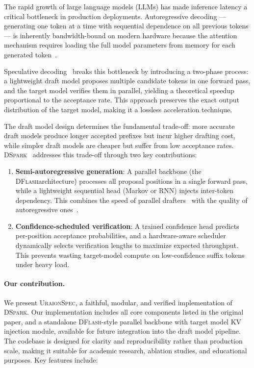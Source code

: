 \documentclass[11pt,a4paper]{article}
\newcommand{\UraionSpec}{\textsc{UraionSpec}}
\newcommand{\DSpark}{\textsc{DSpark}}
\newcommand{\DFlash}{\textsc{DFlash}}
\begin{document}
The rapid growth of large language models (LLMs) has made inference latency a
critical bottleneck in production deployments. Autoregressive decoding ---
generating one token at a time with sequential dependence on all previous
tokens --- is inherently bandwidth-bound on modern hardware because the
attention mechanism requires loading the full model parameters from memory
for each generated token~\cite{pope2023efficiently, leviathan2023fast}.

Speculative decoding~\cite{leviathan2023fast, chen2023accelerating} breaks
this bottleneck by introducing a two-phase process: a lightweight draft model
proposes multiple candidate tokens in one forward pass, and the target model
verifies them in parallel, yielding a theoretical speedup proportional to the
acceptance rate. This approach preserves the exact output distribution of the
target model, making it a lossless acceleration technique.

The draft model design determines the fundamental trade-off: more accurate
draft models produce longer accepted prefixes but incur higher drafting cost,
while simpler draft models are cheaper but suffer from low acceptance rates.
\DSpark~\cite{cheng2026dspark} addresses this trade-off through two key
contributions:

\begin{enumerate}
  \item \textbf{Semi-autoregressive generation}: A parallel backbone
    (the \DFlash architecture) processes all proposal positions in a
    single forward pass, while a lightweight sequential head (Markov or RNN)
    injects inter-token dependency. This combines the speed of parallel
    drafters~\cite{stern2018blockwise, xia2024medusa} with the quality of
    autoregressive ones~\cite{miao2025eagle3}.
  \item \textbf{Confidence-scheduled verification}: A trained confidence head
    predicts per-position acceptance probabilities, and a hardware-aware
    scheduler dynamically selects verification lengths to maximize expected
    throughput. This prevents wasting target-model compute on low-confidence
    suffix tokens under heavy load.
\end{enumerate}

\paragraph{Our contribution.}
We present \UraionSpec, a faithful, modular, and verified implementation of
\DSpark. Our implementation includes all core components listed in the
original paper, and a standalone \DFlash-style parallel backbone with target model KV
injection module, available for future integration into the draft model pipeline.
The codebase is designed for clarity and reproducibility rather than
production scale, making it suitable for academic research, ablation studies,
and educational purposes. Key features include:
\end{document}
